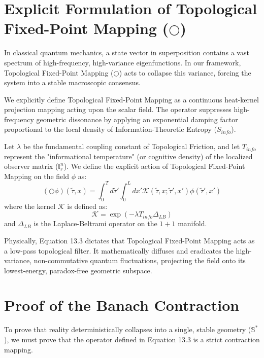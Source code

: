 \documentclass[12pt,openany]{book}
\theoremstyle{plain}
\theoremstyle{definition}
\theoremstyle{remark}
\begin{document}
\section{Explicit Formulation of Topological Fixed-Point Mapping ($\bigcirc$)}

In classical quantum mechanics, a state vector in superposition contains a vast spectrum of high-frequency, high-variance eigenfunctions. In our framework, Topological Fixed-Point Mapping ($\bigcirc$) acts to collapse this variance, forcing the system into a stable macroscopic consensus.

We explicitly define Topological Fixed-Point Mapping as a continuous heat-kernel projection mapping acting upon the scalar field. The operator suppresses high-frequency geometric dissonance by applying an exponential damping factor proportional to the local density of Information-Theoretic Entropy ($S_{info}$).

Let $\lambda$ be the fundamental coupling constant of Topological Friction, and let $T_{info}$ represent the "informational temperature" (or cognitive density) of the localized observer matrix ($\mathbb{I}_r^n$). We define the explicit action of Topological Fixed-Point Mapping on the field $\phi$ as:
\begin{equation}
(\bigcirc \phi)(\tilde{\tau}, x) = \int_0^T d\tilde{\tau}' \int_0^L dx' \mathcal{K}(\tilde{\tau}, x ; \tilde{\tau}', x') \phi(\tilde{\tau}', x')
\end{equation}
where the kernel $\mathcal{K}$ is defined as:
\begin{equation}
\mathcal{K} = \exp\left( - \lambda T_{info} \Delta_{LB} \right)
\end{equation}
and $\Delta_{LB}$ is the Laplace-Beltrami operator on the $1+1$ manifold. 

Physically, Equation 13.3 dictates that Topological Fixed-Point Mapping acts as a low-pass topological filter. It mathematically diffuses and eradicates the high-variance, non-commutative quantum fluctuations, projecting the field onto its lowest-energy, paradox-free geometric subspace.

\section{Proof of the Banach Contraction}

To prove that reality deterministically collapses into a single, stable geometry ($\mathbb{S}^*$), we must prove that the operator defined in Equation 13.3 is a strict contraction mapping. 
\end{document}
